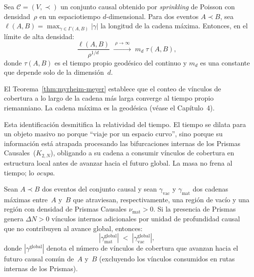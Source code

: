 \documentclass[11pt, a4paper, openany]{book}
\begin{document}
\begin{theorem}
\label{thm:myrheim-meyer}
Sea $\mathcal{C} = (V, \prec)$ un conjunto causal obtenido por
\emph{sprinkling} de Poisson con densidad~$\rho$ en un espaciotiempo
$d$-dimensional. Para dos eventos $A \prec B$, sea
$\ell(A,B) = \max_{\gamma \in \Gamma(A,B)} |\gamma|$ la longitud de la
cadena m\'axima. Entonces, en el l\'imite de alta densidad:
\begin{equation}
  \frac{\ell(A,B)}{\rho^{1/d}}
  \;\xrightarrow{\;\rho \to \infty\;}
  \; m_d \;\tau(A,B),
  \label{eq:myrheim-meyer}
\end{equation}
donde $\tau(A,B)$ es el tiempo propio geod\'esico del continuo y
$m_d$ es una constante que depende solo de la dimensi\'on~$d$.
\end{theorem}

\noindent
El Teorema~\ref{thm:myrheim-meyer} establece que el conteo de
v\'inculos de cobertura a lo largo de la cadena m\'as larga converge
al tiempo propio riemanniano. La cadena m\'axima es la geod\'esica
(v\'ease el Cap\'itulo~4).

\medskip
Esta identificaci\'on desmitifica la relatividad del tiempo. El tiempo
se dilata para un objeto masivo no porque ``viaje por un espacio
curvo'', sino porque su informaci\'on est\'a atrapada procesando las
bifurcaciones internas de los Prismas Causales~($K_{2,N}$), obligando
a su cadena a consumir v\'inculos de cobertura en estructura local
antes de avanzar hacia el futuro global. La masa no frena al
tiempo; lo \emph{ocupa}.

\begin{theorem}
\label{thm:time-dilation}
Sean $A \prec B$ dos eventos del conjunto causal y sean
$\gamma_{\text{vac}}$ y $\gamma_{\text{mat}}$ dos cadenas m\'aximas
entre~$A$ y~$B$ que atraviesan, respectivamente, una regi\'on de
vac\'io y una regi\'on con densidad de Prismas Causales
$\nu_{\text{mat}} > 0$. Si la presencia de Prismas genera
$\Delta N > 0$ v\'inculos internos adicionales por unidad de
profundidad causal que no contribuyen al avance global, entonces:
\begin{equation}
  |\gamma_{\text{mat}}^{\text{global}}|
  \;<\;
  |\gamma_{\text{vac}}^{\text{global}}|,
  \label{eq:time-dilation}
\end{equation}
donde $|\gamma^{\text{global}}|$ denota el n\'umero de v\'inculos de
cobertura que avanzan hacia el futuro causal com\'un de~$A$ y~$B$
(excluyendo los v\'inculos consumidos en rutas internas de los Prismas).
\end{theorem}
\end{document}
